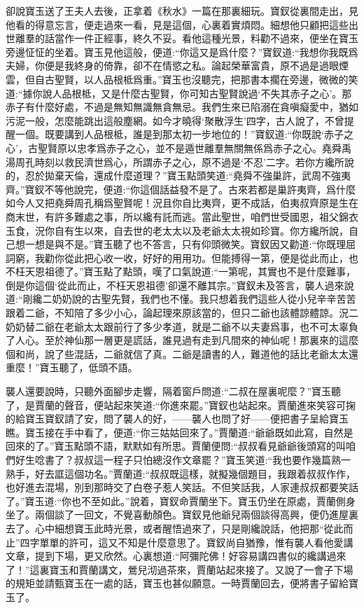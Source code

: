 \begin{parag}
    卻說寶玉送了王夫人去後，正拿着《秋水》一篇在那裏細玩。寶釵從裏間走出，見他看的得意忘言，便走過來一看，見是這個，心裏着實煩悶。細想他只顧把這些出世離羣的話當作一件正經事，終久不妥。看他這種光景，料勸不過來，便坐在寶玉旁邊怔怔的坐着。寶玉見他這般，便道:“你這又是爲什麼？”寶釵道:“我想你我既爲夫婦，你便是我終身的倚靠，卻不在情慾之私。論起榮華富貴，原不過是過眼煙雲，但自古聖賢，以人品根柢爲重。”寶玉也沒聽完，把那書本擱在旁邊，微微的笑道:“據你說人品根柢，又是什麼古聖賢，你可知古聖賢說過‘不失其赤子之心’。那赤子有什麼好處，不過是無知無識無貪無忌。我們生來已陷溺在貪嗔癡愛中，猶如污泥一般，怎麼能跳出這般塵網。如今才曉得‘聚散浮生’四字，古人說了，不曾提醒一個。既要講到人品根柢，誰是到那太初一步地位的！”寶釵道:“你既說‘赤子之心’，古聖賢原以忠孝爲赤子之心，並不是遁世離羣無關無係爲赤子之心。堯舜禹湯周孔時刻以救民濟世爲心，所謂赤子之心，原不過是‘不忍’二字。若你方纔所說的，忍於拋棄天倫，還成什麼道理？”寶玉點頭笑道:“堯舜不強巢許，武周不強夷齊。”寶釵不等他說完，便道:“你這個話益發不是了。古來若都是巢許夷齊，爲什麼如今人又把堯舜周孔稱爲聖賢呢！況且你自比夷齊，更不成話，伯夷叔齊原是生在商末世，有許多難處之事，所以纔有託而逃。當此聖世，咱們世受國恩，祖父錦衣玉食，況你自有生以來，自去世的老太太以及老爺太太視如珍寶。你方纔所說，自己想一想是與不是。”寶玉聽了也不答言，只有仰頭微笑。寶釵因又勸道:“你既理屈詞窮，我勸你從此把心收一收，好好的用用功。但能搏得一第，便是從此而止，也不枉天恩祖德了。”寶玉點了點頭，嘆了口氣說道:“一第呢，其實也不是什麼難事，倒是你這個‘從此而止，不枉天恩祖德’卻還不離其宗。”寶釵未及答言，襲人過來說道:“剛纔二奶奶說的古聖先賢，我們也不懂。我只想着我們這些人從小兒辛辛苦苦跟着二爺，不知陪了多少小心，論起理來原該當的，但只二爺也該體諒體諒。況二奶奶替二爺在老爺太太跟前行了多少孝道，就是二爺不以夫妻爲事，也不可太辜負了人心。至於神仙那一層更是謊話，誰見過有走到凡間來的神仙呢！那裏來的這麼個和尚，說了些混話，二爺就信了真。二爺是讀書的人，難道他的話比老爺太太還重麼！”寶玉聽了，低頭不語。
\end{parag}


\begin{parag}
    襲人還要說時，只聽外面腳步走響，隔着窗戶問道:“二叔在屋裏呢麼？”寶玉聽了，是賈蘭的聲音，便站起來笑道:“你進來罷。”寶釵也站起來。賈蘭進來笑容可掬的給寶玉寶釵請了安，問了襲人的好，——襲人也問了好——便把書子呈給寶玉瞧。寶玉接在手中看了，便道:“你三姑姑回來了。”賈蘭道:“爺爺既如此寫，自然是回來的了。”寶玉點頭不語，默默如有所思。賈蘭便問:“叔叔看見爺爺後頭寫的叫咱們好生唸書了？叔叔這一程子只怕總沒作文章罷？”寶玉笑道:“我也要作幾篇熟一熟手，好去誆這個功名。”賈蘭道:“叔叔既這樣，就擬幾個題目，我跟着叔叔作作，也好進去混場，別到那時交了白卷子惹人笑話。不但笑話我，人家連叔叔都要笑話了。”寶玉道:“你也不至如此。”說着，寶釵命賈蘭坐下。寶玉仍坐在原處，賈蘭側身坐了。兩個談了一回文，不覺喜動顏色。寶釵見他爺兒兩個談得高興，便仍進屋裏去了。心中細想寶玉此時光景，或者醒悟過來了，只是剛纔說話，他把那“從此而止”四字單單的許可，這又不知是什麼意思了。寶釵尚自猶豫，惟有襲人看他愛講文章，提到下場，更又欣然。心裏想道:“阿彌陀佛！好容易講四書似的纔講過來了！”這裏寶玉和賈蘭講文，鶯兒沏過茶來，賈蘭站起來接了。又說了一會子下場的規矩並請甄寶玉在一處的話，寶玉也甚似願意。一時賈蘭回去，便將書子留給寶玉了。
\end{parag}


